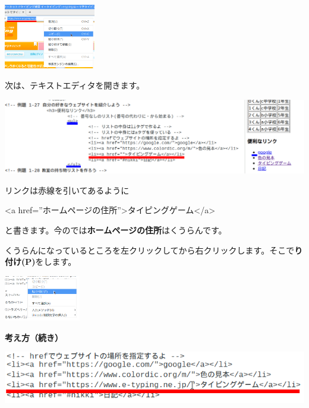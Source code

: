 \centering
\includegraphics[width=0.3\textwidth]{text01-img/textbook-img197.png}

\bigskip
\flushleft

次は、テキストエディタを開きます。

\centering
\includegraphics[width=\textwidth]{text01-img/textbook-img198.png}

\bigskip
\flushleft

リンクは赤線を引いてあるように

{\textless}a
href=”ホームページの住所”{\textgreater}タイピングゲーム{\textless}/a{\textgreater}

と書きます。今のでは\textbf{ホームページの住所}はくうらんです。

くうらんになっているところを左クリックしてから右クリックします。そこで\textbf{り付け(P)}をします。





\centering
\includegraphics[width=0.25\textwidth]{text01-img/textbook-img199.png}

\clearpage


\flushleft
\textbf{考え方（続き）}


\bigskip

\centering
\includegraphics[width=\textwidth]{text01-img/textbook-img200.png}

